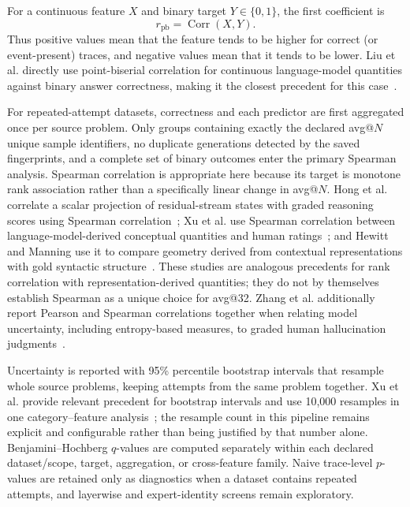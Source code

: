 For a continuous feature $X$ and binary target $Y\in\{0,1\}$, the first
coefficient is
\begin{equation}
  r_{\mathrm{pb}} = \operatorname{Corr}(X,Y).
\end{equation}
Thus positive values mean that the feature tends to be higher for correct (or
event-present) traces, and negative values mean that it tends to be lower.
Liu et al. directly use point-biserial correlation for continuous language-model
quantities against binary answer correctness, making it the closest precedent
for this case~\cite{liu-etal-2022-figurative}.

For repeated-attempt datasets, correctness and each predictor are first
aggregated once per source problem.  Only groups containing exactly the
declared avg@$N$ unique sample identifiers, no duplicate generations detected
by the saved fingerprints, and a complete set of binary outcomes enter the
primary Spearman analysis.  Spearman correlation is appropriate here because
its target is monotone rank association rather than a specifically linear
change in avg@$N$.  Hong et al. correlate a
scalar projection of residual-stream states with graded reasoning scores using
Spearman correlation~\cite{hong-etal-2025-interplay}; Xu et al. use Spearman
correlation between language-model-derived conceptual quantities and human
ratings~\cite{xu-etal-2025-conceptual}; and Hewitt and Manning use it to compare
geometry derived from contextual representations with gold syntactic
structure~\cite{hewitt-manning-2019-structural}.  These studies are analogous
precedents for rank correlation with representation-derived quantities; they
do not by themselves establish Spearman as a unique choice for avg@32.
Zhang et al. additionally report Pearson and Spearman correlations together
when relating model uncertainty, including entropy-based measures, to graded
human hallucination judgments~\cite{zhang-etal-2023-uncertainty}.

Uncertainty is reported with 95\% percentile bootstrap intervals that resample
whole source problems, keeping attempts from the same problem together.  Xu et
al. provide relevant precedent for bootstrap intervals and use 10,000
resamples in one category--feature analysis~\cite{xu-etal-2025-conceptual}; the
resample count in this pipeline remains explicit and configurable rather than
being justified by that number alone.  Benjamini--Hochberg $q$-values are
computed separately within each declared dataset/scope, target, aggregation,
or cross-feature family.  Naive trace-level $p$-values are retained only as
diagnostics when a dataset contains repeated attempts, and layerwise and
expert-identity screens remain exploratory.


